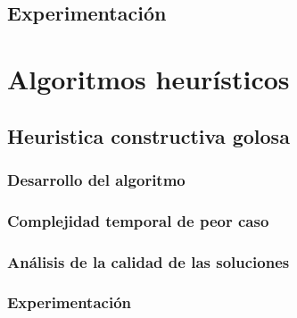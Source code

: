 \documentclass[a4paper, 10pt, twoside]{article}
\begin{document}
  \subsection{Experimentación}
  \label{sub:algoritmo-exacto-experimentacion}
  

\newpage



\section{Algoritmos heurísticos}
\label{sec:algoritmos-heuristicos}

  \subsection{Heuristica constructiva golosa}
  \label{sub:algoritmos-heuristicos-goloso}
      \subsubsection{Desarrollo del algoritmo}
      \label{subsub:algoritmos-heuristicos-goloso-desarrollo.tex}
      

      \subsubsection{Complejidad temporal de peor caso}
      \label{subsub:algoritmos-heuristicos-goloso-complejidad.tex}
      

      \subsubsection{Análisis de la calidad de las soluciones}
      \label{subsub:algoritmos-heuristicos-goloso-calidad.tex}
      

      \subsubsection{Experimentación}
      \label{subsub:algoritmos-heuristicos-goloso-experimentacion.tex}
      
  \newpage
\end{document}
